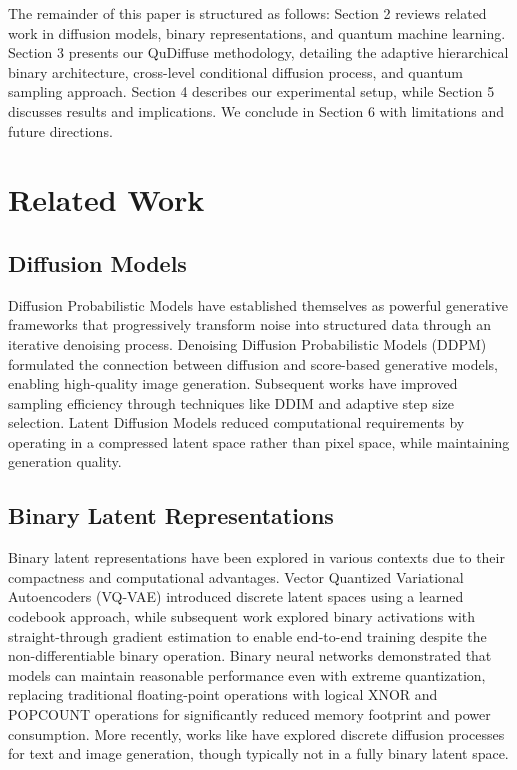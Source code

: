 \documentclass[10pt,twocolumn,letterpaper]{article}
\begin{document}
The remainder of this paper is structured as follows: Section 2 reviews related work in diffusion models, binary representations, and quantum machine learning. Section 3 presents our QuDiffuse methodology, detailing the adaptive hierarchical binary architecture, cross-level conditional diffusion process, and quantum sampling approach. Section 4 describes our experimental setup, while Section 5 discusses results and implications. We conclude in Section 6 with limitations and future directions.

\section{Related Work}
\label{related}

\subsection{Diffusion Models}
Diffusion Probabilistic Models \cite{diffusion, ddpm} have established themselves as powerful generative frameworks that progressively transform noise into structured data through an iterative denoising process. Denoising Diffusion Probabilistic Models (DDPM) \cite{ddpm} formulated the connection between diffusion and score-based generative models, enabling high-quality image generation. Subsequent works have improved sampling efficiency through techniques like DDIM \cite{ddim} and adaptive step size selection. Latent Diffusion Models \cite{latent} reduced computational requirements by operating in a compressed latent space rather than pixel space, while maintaining generation quality.

\subsection{Binary Latent Representations}
Binary latent representations have been explored in various contexts due to their compactness and computational advantages. Vector Quantized Variational Autoencoders (VQ-VAE) \cite{vqvae} introduced discrete latent spaces using a learned codebook approach, while subsequent work explored binary activations with straight-through gradient estimation \cite{bengio2013estimating, bengio2013propagating} to enable end-to-end training despite the non-differentiable binary operation. Binary neural networks \cite{binarized, courbariaux2016binarized} demonstrated that models can maintain reasonable performance even with extreme quantization, replacing traditional floating-point operations with logical XNOR and POPCOUNT operations for significantly reduced memory footprint and power consumption. More recently, works like \cite{structured, unleashing} have explored discrete diffusion processes for text and image generation, though typically not in a fully binary latent space.
\end{document}
